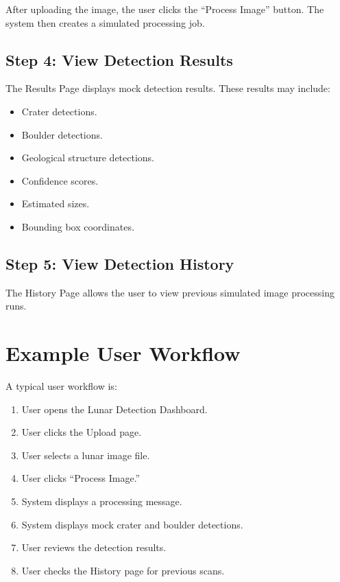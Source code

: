 \documentclass[12pt]{article}
\begin{document}
After uploading the image, the user clicks the ``Process Image'' button. The system then creates a simulated processing job.

\subsection{Step 4: View Detection Results}

The Results Page displays mock detection results. These results may include:

\begin{itemize}
    \item Crater detections.
    \item Boulder detections.
    \item Geological structure detections.
    \item Confidence scores.
    \item Estimated sizes.
    \item Bounding box coordinates.
\end{itemize}

\subsection{Step 5: View Detection History}

The History Page allows the user to view previous simulated image processing runs.

\section{Example User Workflow}

A typical user workflow is:

\begin{enumerate}
    \item User opens the Lunar Detection Dashboard.
    \item User clicks the Upload page.
    \item User selects a lunar image file.
    \item User clicks ``Process Image.''
    \item System displays a processing message.
    \item System displays mock crater and boulder detections.
    \item User reviews the detection results.
    \item User checks the History page for previous scans.
\end{enumerate}
\end{document}
